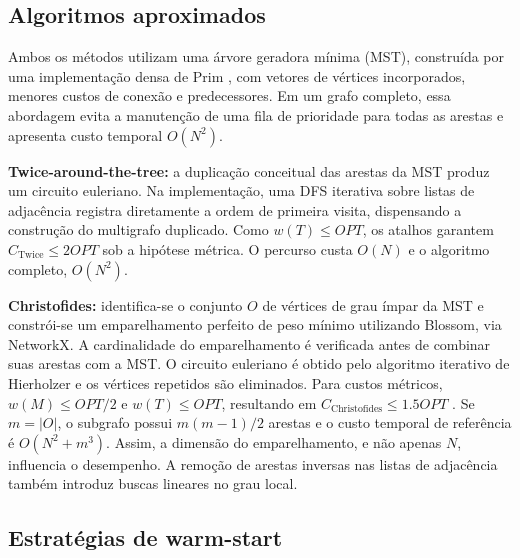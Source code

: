 \subsection{Algoritmos aproximados}

Ambos os métodos utilizam uma árvore geradora mínima (MST), construída por uma implementação densa de Prim \cite{prim1957}, com vetores de vértices incorporados, menores custos de conexão e predecessores. Em um grafo completo, essa abordagem evita a manutenção de uma fila de prioridade para todas as arestas e apresenta custo temporal $O(N^2)$.

\textbf{Twice-around-the-tree:} a duplicação conceitual das arestas da MST produz um circuito euleriano. Na implementação, uma DFS iterativa sobre listas de adjacência registra diretamente a ordem de primeira visita, dispensando a construção do multigrafo duplicado. Como $w(T)\leq OPT$, os atalhos garantem $C_{\mathrm{Twice}}\leq2OPT$ sob a hipótese métrica. O percurso custa $O(N)$ e o algoritmo completo, $O(N^2)$.

\textbf{Christofides:} identifica-se o conjunto $O$ de vértices de grau ímpar da MST e constrói-se um emparelhamento perfeito de peso mínimo utilizando Blossom, via NetworkX. A cardinalidade do emparelhamento é verificada antes de combinar suas arestas com a MST. O circuito euleriano é obtido pelo algoritmo iterativo de Hierholzer e os vértices repetidos são eliminados. Para custos métricos, $w(M)\leq OPT/2$ e $w(T)\leq OPT$, resultando em $C_{\mathrm{Christofides}}\leq 1.5OPT$ \cite{christofides1976}. Se $m=|O|$, o subgrafo possui $m(m-1)/2$ arestas e o custo temporal de referência é $O(N^2+m^3)$. Assim, a dimensão do emparelhamento, e não apenas $N$, influencia o desempenho. A remoção de arestas inversas nas listas de adjacência também introduz buscas lineares no grau local.

\subsection{Estratégias de warm-start}

